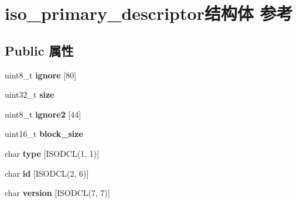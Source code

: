 \hypertarget{structiso__primary__descriptor}{}\section{iso\+\_\+primary\+\_\+descriptor结构体 参考}
\label{structiso__primary__descriptor}
\subsection*{Public 属性}
\begin{DoxyCompactItemize}
\item 
\mbox{\label{structiso__primary__descriptor_a244432600f21317bfe8c21b5ae947cfd}} 
uint8\+\_\+t {\bfseries ignore} \mbox{[}80\mbox{]}
\item 
\mbox{\label{structiso__primary__descriptor_a7841b39843b58fedad8c0e008b38d0c8}} 
uint32\+\_\+t {\bfseries size}
\item 
\mbox{\label{structiso__primary__descriptor_a1b5972de963871fc0561275789ec4567}} 
uint8\+\_\+t {\bfseries ignore2} \mbox{[}44\mbox{]}
\item 
\mbox{\label{structiso__primary__descriptor_a9aec8bd48408fbf776d3b7ee84462f5e}} 
uint16\+\_\+t {\bfseries block\+\_\+size}
\item 
\mbox{\label{structiso__primary__descriptor_a36642c9c56c28d92a6f0b650c87fa8f9}} 
char {\bfseries type} \mbox{[}I\+S\+O\+D\+CL(1, 1)\mbox{]}
\item 
\mbox{\label{structiso__primary__descriptor_a626f54badc91d8626250fad69f489a63}} 
char {\bfseries id} \mbox{[}I\+S\+O\+D\+CL(2, 6)\mbox{]}
\item 
\mbox{\label{structiso__primary__descriptor_aefbc1bb69f913a642004a90b29ff26e9}} 
char {\bfseries version} \mbox{[}I\+S\+O\+D\+CL(7, 7)\mbox{]}
\item 
\mbox{\label{structiso__primary__descriptor_abe53c28bac8bb3d13048160f1b762280}} 

\end{DoxyCompactItemize}
